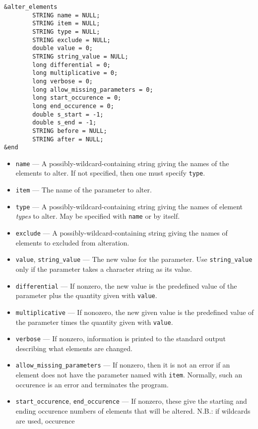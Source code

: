 \documentclass[11pt]{article}
\begin{document}
\begin{verbatim}
&alter_elements
        STRING name = NULL;
        STRING item = NULL;
        STRING type = NULL;
        STRING exclude = NULL;
        double value = 0;
        STRING string_value = NULL;
        long differential = 0;
        long multiplicative = 0;
        long verbose = 0;
        long allow_missing_parameters = 0;
        long start_occurence = 0;
        long end_occurence = 0;
        double s_start = -1;
        double s_end = -1;
        STRING before = NULL;
        STRING after = NULL;
&end
\end{verbatim}

\begin{itemize}
\item \verb|name| --- A possibly-wildcard-containing string giving the names of the
        elements to alter.  If not specified, then one must specify \verb|type|.
\item \verb|item| --- The name of the parameter to alter.
\item \verb|type| --- A possibly-wildcard-containing string giving the names of element
        {\em types} to alter.  May be specified with \verb|name| or by itself.
\item \verb|exclude| --- A possibly-wildcard-containing string giving the names of elements
        to excluded from alteration.
\item \verb|value|, \verb|string_value| --- The new value for the parameter.  Use
      \verb|string_value| only if the parameter takes a character string as its value.
\item \verb|differential| --- If nonzero, the new value is 
        the predefined value of the parameter plus the quantity given with \verb|value|.
\item \verb|multiplicative| --- If nonozero, the new given value is the predefined
        value of the parameter times the quantity given with \verb|value|.
\item \verb|verbose| --- If nonzero, information is printed to the standard output describing
        what elements are changed.
\item \verb|allow_missing_parameters| --- If nonzero, then it is not an error if an
        element does not have the parameter named with \verb|item|.  Normally, such
        an occurence is an error and terminates the program.
\item \verb|start_occurence|, \verb|end_occurence| --- If nonzero, these give the starting and
 ending occurence numbers of elements that will be altered.  N.B.: if wildcards are used, occurence

\end{itemize}
\end{document}
